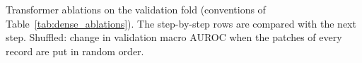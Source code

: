 \begin{table}[htbp]
\centering
\caption[Transformer: ablations (validation)]{Transformer ablations on the validation fold (conventions of Table~\ref{tab:dense_ablations}). The step-by-step rows are compared with the next step. Shuffled: change in validation macro AUROC when the patches of every record are put in random order.}
\label{tab:transformer_ablations}
\small
\begin{adjustbox}{max width=\textwidth}

\end{adjustbox}
\end{table}
